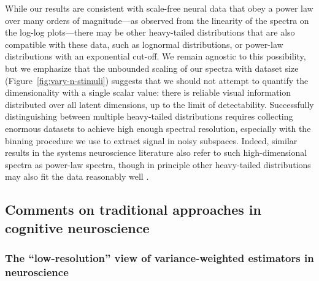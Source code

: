 \documentclass[10pt]{article}
\begin{document}
While our results are consistent with scale-free neural data that obey a power law over many orders of magnitude---as observed from the linearity of the spectra on the log-log plots---there may be other heavy-tailed distributions that are also compatible with these data, such as lognormal distributions, or power-law distributions with an exponential cut-off. We remain agnostic to this possibility, but we emphasize that the unbounded scaling of our spectra with dataset size (Figure~\ref{fig:vary-n-stimuli}) suggests that we should not attempt to quantify the dimensionality with a single scalar value: there is reliable visual information distributed over all latent dimensions, up to the limit of detectability. Successfully distinguishing between multiple heavy-tailed distributions requires collecting enormous datasets to achieve high enough spectral resolution, especially with the binning procedure we use to extract signal in noisy subspaces. Indeed, similar results in the systems neuroscience literature also refer to such high-dimensional spectra as power-law spectra, though in principle other heavy-tailed distributions may also fit the data reasonably well \autocite{Stringer2019,Manley2024}.

\subsection{Comments on traditional approaches in cognitive neuroscience}\label{comments-on-traditional-approaches-in-cognitive-neuroscience}

\subsubsection{The ``low-resolution'' view of variance-weighted estimators in neuroscience}\label{the-low-resolution-view-of-variance-weighted-estimators-in-neuroscience}
\end{document}

